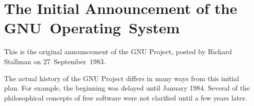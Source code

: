 \chapter{The Initial Announcement of the GNU~Operating~System}
\label{Initial Announcement}

This is the original announcement of the GNU Project, posted by
Richard Stallman on 27~September~1983.

The actual history of the GNU Project differs in many ways from
this initial plan. For example, the beginning was delayed until
January 1984. Several of the philosophical concepts of free software
were not clarified until a few years later.

